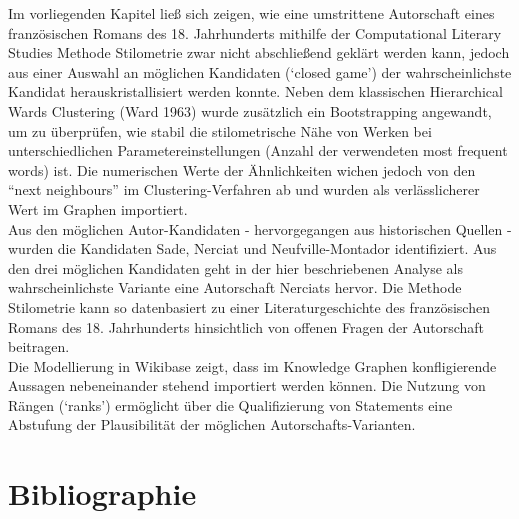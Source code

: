 \documentclass[
  12pt,
  letterpaper,
]{classicthesis}
\begin{document}
Im vorliegenden Kapitel ließ sich zeigen, wie eine umstrittene
Autorschaft eines französischen Romans des 18. Jahrhunderts mithilfe der
Computational Literary Studies Methode Stilometrie zwar nicht
abschließend geklärt werden kann, jedoch aus einer Auswahl an möglichen
Kandidaten (`closed game') der wahrscheinlichste Kandidat
herauskristallisiert werden konnte. Neben dem klassischen Hierarchical
Wards Clustering (Ward 1963) wurde zusätzlich ein Bootstrapping
angewandt, um zu überprüfen, wie stabil die stilometrische Nähe von
Werken bei unterschiedlichen Parametereinstellungen (Anzahl der
verwendeten most frequent words) ist. Die numerischen Werte der
Ähnlichkeiten wichen jedoch von den ``next neighbours'' im
Clustering-Verfahren ab und wurden als verlässlicherer Wert im Graphen
importiert.\\
Aus den möglichen Autor-Kandidaten - hervorgegangen aus historischen
Quellen - wurden die Kandidaten Sade, Nerciat und Neufville-Montador
identifiziert. Aus den drei möglichen Kandidaten geht in der hier
beschriebenen Analyse als wahrscheinlichste Variante eine Autorschaft
Nerciats hervor. Die Methode Stilometrie kann so datenbasiert zu einer
Literaturgeschichte des französischen Romans des 18. Jahrhunderts
hinsichtlich von offenen Fragen der Autorschaft beitragen.\\
Die Modellierung in Wikibase zeigt, dass im Knowledge Graphen
konfligierende Aussagen nebeneinander stehend importiert werden können.
Die Nutzung von Rängen (`ranks') ermöglicht über die Qualifizierung von
Statements eine Abstufung der Plausibilität der möglichen
Autorschafts-Varianten.

\section{Bibliographie}\label{bibliographie}
\end{document}
